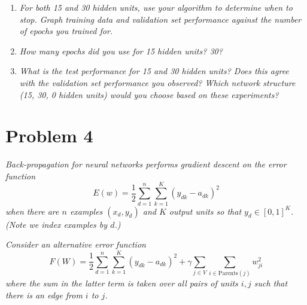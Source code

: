 \documentclass{article}
\begin{document}
\begin{enumerate}
\begin{enumerate}
    \item \textit{For both 15 and 30 hidden units, use your algorithm to
      determine when to stop.  Graph training data and validation set
      performance against the number of epochs you trained for.}

    \item \textit{How many epochs did you use for 15 hidden units?
      30?}

    \item \textit{What is the test performance for 15 and 30 hidden
      units? Does this agree with the validation set performance you
      observed? Which network structure (15, 30, 0 hidden units) would
      you choose based on these experiments?}

    \end{enumerate}


  \end{enumerate}

  \section*{Problem 4}
  \textit{Back-propagation for neural networks performs gradient
    descent on the error function}
  \[E(w)=\frac{1}{2}\sum_{d=1}^n\sum_{k=1}^K(y_{dk}-a_{dk})^2\]
  \textit{when there are $n$ examples $(x_d,y_d)$ and $K$ output units
    so that $y_d\in [0,1]^K$. (Note we index examples by $d$.)}

  \textit{Consider an alternative error function}
  \[F(W)=\frac12\sum_{d=1}^n\sum_{k=1}^K(y_{dk}-a_{dk})^2+\gamma\sum_{j\in V}\sum_{i\in\text{Parents}(j)}w_{ji}^2\]
  \textit{where the sum in the latter term is taken over all pairs of
    units $i,j$ such that there is an edge from $i$ to $j$.}
\end{document}
